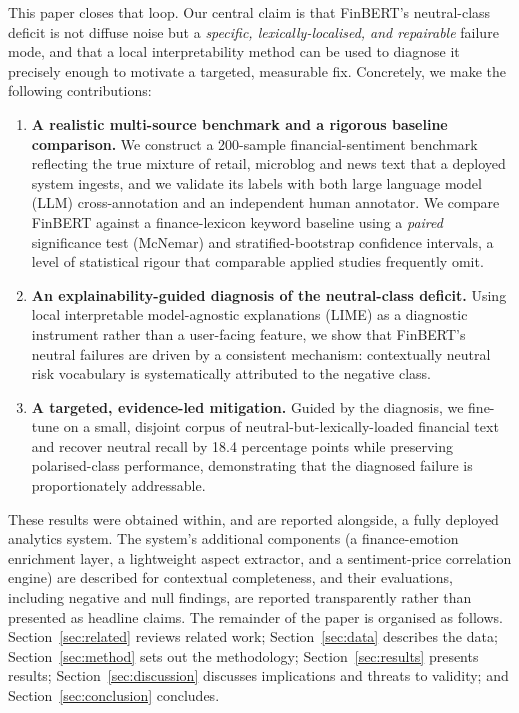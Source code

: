 \documentclass{aims}
\numberwithin{equation}{section}
\begin{document}
This paper closes that loop. Our central claim is that FinBERT's neutral-class
deficit is not diffuse noise but a \emph{specific, lexically-localised, and
repairable} failure mode, and that a local interpretability method can be used to
diagnose it precisely enough to motivate a targeted, measurable fix. Concretely,
we make the following contributions:
\begin{enumerate}
\item \textbf{A realistic multi-source benchmark and a rigorous baseline
comparison.} We construct a 200-sample financial-sentiment benchmark reflecting
the true mixture of retail, microblog and news text that a deployed system
ingests, and we validate its labels with both large language model (LLM) cross-annotation and an
independent human annotator. We compare FinBERT against a finance-lexicon keyword
baseline using a \emph{paired} significance test (McNemar) and stratified-bootstrap
confidence intervals, a level of statistical rigour that comparable applied studies
frequently omit.
\item \textbf{An explainability-guided diagnosis of the neutral-class deficit.}
Using local interpretable model-agnostic explanations (LIME) as a diagnostic
instrument rather than a user-facing feature, we show
that FinBERT's neutral failures are driven by a consistent mechanism: contextually
neutral risk vocabulary is systematically attributed to the negative class.
\item \textbf{A targeted, evidence-led mitigation.} Guided by the diagnosis, we
fine-tune on a small, disjoint corpus of neutral-but-lexically-loaded financial
text and recover neutral recall by 18.4 percentage points while preserving
polarised-class performance, demonstrating that the diagnosed failure is
proportionately addressable.
\end{enumerate}

These results were obtained within, and are reported alongside, a fully deployed analytics system. The system's additional components (a finance-emotion enrichment layer, a lightweight aspect extractor, and a sentiment-price correlation engine) are described for contextual completeness, and their evaluations, including negative and null findings, are reported transparently rather than presented as headline claims. The remainder of the paper is organised as follows. Section~\ref{sec:related}
reviews related work; Section~\ref{sec:data} describes the data;
Section~\ref{sec:method} sets out the methodology; Section~\ref{sec:results}
presents results; Section~\ref{sec:discussion} discusses implications and threats
to validity; and Section~\ref{sec:conclusion} concludes.
\end{document}
